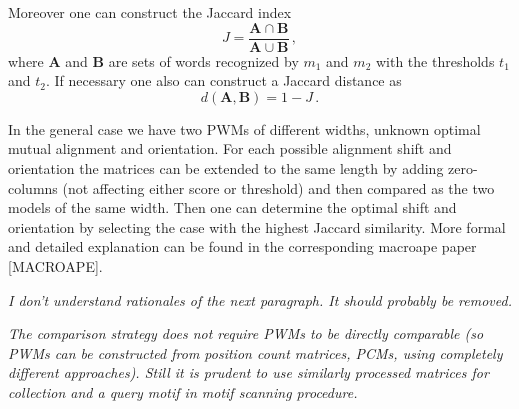 Moreover one can construct the Jaccard index 
$$J = \frac{\mathbf{A}\cap \mathbf{B}}{\mathbf{A}\cup \mathbf{B}}\,, $$
where $\mathbf{A}$ and $\mathbf{B}$ are 
sets of words recognized by $m_1$ and $m_2$ with the thresholds $t_1$ and $t_2$. If necessary one also can 
construct a Jaccard distance as $$d(\mathbf{A},\mathbf{B}) = 1 - J\,.$$

In the general case we have two PWMs of different widths, unknown optimal mutual 
alignment and orientation. For each possible alignment shift and orientation the matrices can be 
extended to the same length by adding zero-columns (not affecting either score or threshold) 
and then compared as the two models of the same width. Then one can determine the optimal 
shift and orientation by selecting the case with the highest Jaccard similarity. More formal and 
detailed explanation can be found in the corresponding macroape paper [MACROAPE].

\emph{
I don't understand rationales of the next paragraph. It should probably be removed.}

\emph{The comparison strategy does not require PWMs to be directly comparable (so PWMs can be 
constructed from position count matrices, PCMs, using completely different approaches). Still it 
is prudent to use similarly processed matrices for collection and a query motif in motif scanning procedure. }
